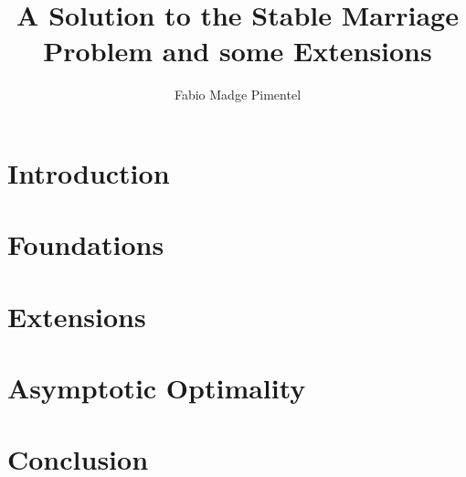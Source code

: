 \documentclass[a4paper,draft]{article}
\begin{document}
\title{A Solution to the Stable Marriage Problem and some Extensions}
\author{Fabio Madge Pimentel}
\date{}
\maketitle

\begin{abstract}

\end{abstract}

\section{Introduction}


\section{Foundations}


\section{Extensions}


\section{Asymptotic Optimality}


\section{Conclusion}




\end{document}
